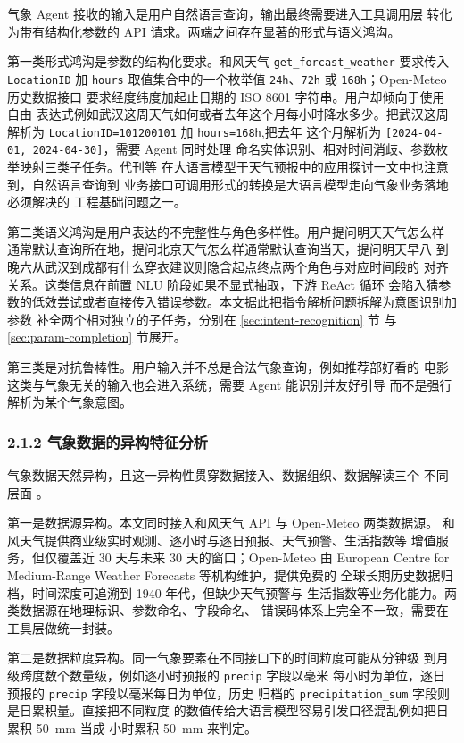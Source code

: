 气象 Agent 接收的输入是用户自然语言查询，输出最终需要进入工具调用层
转化为带有结构化参数的 API 请求。两端之间存在显著的形式与语义鸿沟。

第一类形式鸿沟是参数的结构化要求。和风天气 \texttt{get\_\bk{}forcast\_\bk{}weather}
要求传入 \texttt{LocationID} 加 \texttt{hours} 取值集合中的一个枚举值
\texttt{24h}、\texttt{72h} 或 \texttt{168h}；Open-Meteo 历史数据接口
要求经度纬度加起止日期的 ISO 8601 字符串。用户却倾向于使用自由
表达式例如武汉这周天气如何或者去年这个月每小时降水多少。把武汉这周
解析为 \texttt{LocationID=\bk{}101200101} 加 \texttt{hours=\bk{}168h},把去年
这个月解析为 \texttt{[2024-04-01, 2024-04-30]}，需要 Agent 同时处理
命名实体识别、相对时间消歧、参数枚举映射三类子任务。代刊等 \cite{ref5}
在大语言模型于天气预报中的应用探讨一文中也注意到，自然语言查询到
业务接口可调用形式的转换是大语言模型走向气象业务落地必须解决的
工程基础问题之一。

第二类语义鸿沟是用户表达的不完整性与角色多样性。用户提问明天天气怎么样
通常默认查询所在地，提问北京天气怎么样通常默认查询当天，提问明天早八
到晚六从武汉到成都有什么穿衣建议则隐含起点终点两个角色与对应时间段的
对齐关系。这类信息在前置 NLU 阶段如果不显式抽取，下游 ReAct 循环
会陷入猜参数的低效尝试或者直接传入错误参数。本文据此把指令解析问题拆解为意图识别加参数
补全两个相对独立的子任务，分别在 \ref{sec:intent-recognition} 节
与 \ref{sec:param-completion} 节展开。

第三类是对抗鲁棒性。用户输入并不总是合法气象查询，例如推荐部好看的
电影这类与气象无关的输入也会进入系统，需要 Agent 能识别并友好引导
而不是强行解析为某个气象意图。

\subsubsection*{2.1.2 \quad 气象数据的异构特征分析}

气象数据天然异构，且这一异构性贯穿数据接入、数据组织、数据解读三个
不同层面 \cite{ref25}。

第一是数据源异构。本文同时接入和风天气 API 与 Open-Meteo 两类数据源。
和风天气提供商业级实时观测、逐小时与逐日预报、天气预警、生活指数等
增值服务，但仅覆盖近 30 天与未来 30 天的窗口；Open-Meteo 由 European
Centre for Medium-Range Weather Forecasts 等机构维护，提供免费的
全球长期历史数据归档，时间深度可追溯到 1940 年代，但缺少天气预警与
生活指数等业务化能力。两类数据源在地理标识、参数命名、字段命名、
错误码体系上完全不一致，需要在工具层做统一封装。

第二是数据粒度异构。同一气象要素在不同接口下的时间粒度可能从分钟级
到月级跨度数个数量级，例如逐小时预报的 \texttt{precip} 字段以毫米
每小时为单位，逐日预报的 \texttt{precip} 字段以毫米每日为单位，历史
归档的 \texttt{precipitation\_\bk{}sum} 字段则是日累积量。直接把不同粒度
的数值传给大语言模型容易引发口径混乱例如把日累积 \SI{50}{mm} 当成
小时累积 \SI{50}{mm} 来判定。

